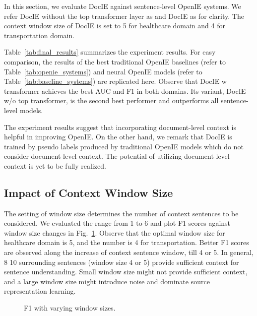 \documentclass[11pt,a4paper]{article}
\newcommand{\mname}{DocIE\xspace}
\newcommand{\textapprox}{\raisebox{0.5ex}{\texttildelow}}
\begin{document}
In this section, we evaluate \mname against sentence-level OpenIE systems. We refer \mname without the top transformer layer as \say{\mname w/o transformer} and \mname as \say{\mname w transformer} for clarity. The context window size of \mname is set to 5 for healthcare domain and 4 for transportation domain. 

Table~\ref{tab:final_results} summarizes the experiment results. For easy comparison, the results of the best traditional OpenIE baselines (refer to Table~\ref{tab:openie_systems}) and neural OpenIE models (refer to Table~\ref{tab:baseline_systems}) are replicated here. Observe that \mname w transformer achieves the best AUC and F1 in both domains. Its variant, \mname w/o top transformer, is the second best performer and outperforms all sentence-level models. 

The experiment results suggest that incorporating document-level context is helpful in improving OpenIE. On the other hand, we remark that \mname is trained by pseudo labels produced by traditional OpenIE models which do not consider document-level context. The potential of utilizing document-level context is yet to be fully realized.  


\subsection{Impact of Context Window Size}\label{sec:results_window}
The setting of window size determines the number of context sentences to be considered. We evaluated the range from 1 to 6 and plot F1 scores against window size changes in Fig.~\ref{fig:win_size}. Observe that the optimal window size for healthcare domain is 5, and the number is 4 for transportation. Better F1 scores are observed along the increase of context sentence window, till 4 or 5. In general,  8 \textapprox 10 surrounding sentences (window size 4 or 5) provide sufficient context for sentence understanding. Small window size might not provide sufficient context, and a large window size might introduce noise and dominate source representation learning. 





\begin{figure}[t]
    \centering
	\vspace{-1em}
	\caption{F1 with varying window sizes.}
	\vspace{-0.8em}
	\label{fig:win_size}
\end{figure}
\end{document}
